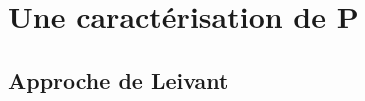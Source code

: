 \documentclass[10pt]{beamer}
\begin{document}

%		
%
%			
%
%
%		
%
%
%		
%		
%
%
	

	\section{Une caractérisation de P}
	\subsection{Approche de Leivant}
	
\end{document}
